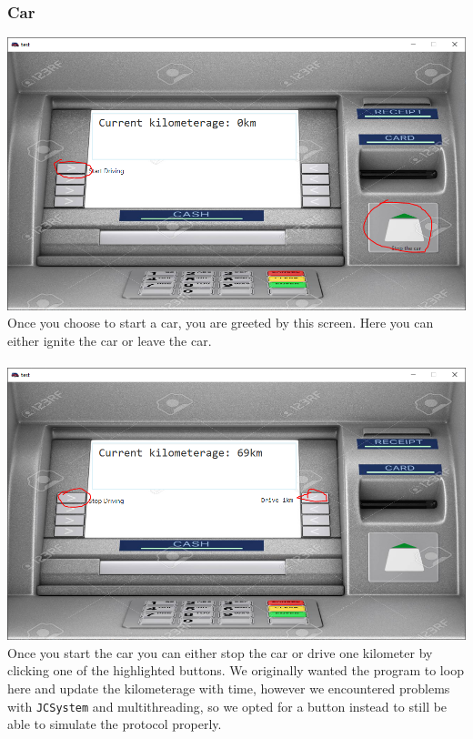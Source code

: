 \documentclass[a4paper]{article}
\begin{document}
\subsubsection{Car}
\includegraphics[width=\textwidth]{carstart.PNG}
Once you choose to start a car, you are greeted by this screen. Here you can either ignite the car or leave the car.\\\\
\includegraphics[width=\textwidth]{driving.PNG}
Once you start the car you can either stop the car or drive one kilometer by clicking one of the highlighted buttons. We originally wanted the program to loop here and update the kilometerage with time, however we encountered problems with \texttt{JCSystem} and multithreading, so we opted for a button instead to still be able to simulate the protocol properly.
\end{document}
